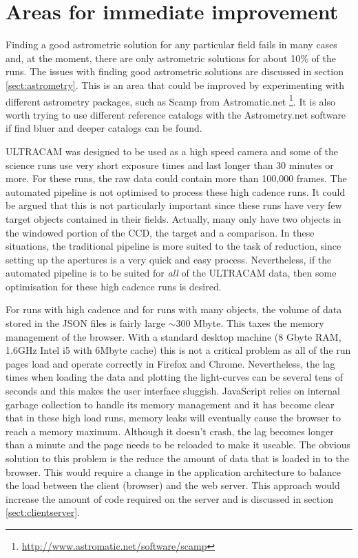 \section{Areas for immediate improvement}
Finding a good astrometric solution for any particular field fails in many cases and, at the moment, there are only astrometric solutions for about 10\% of the runs. The issues with finding good astrometric solutions are discussed in section \ref{sect:astrometry}. This is an area that could be improved by experimenting with different astrometry packages, such as Scamp from Astromatic.net \footnote{\url{http://www.astromatic.net/software/scamp}}. It is also worth trying to use different reference catalogs with the Astrometry.net software if find bluer and deeper catalogs can be found. 

ULTRACAM was designed to be used as a high speed camera and some of the science runs use very short exposure times and last longer than 30 minutes or more. For these runs,  the raw data could contain more than 100,000 frames. The automated pipeline is not optimised to process these high cadence runs. It could be argued that this is not particularly important since these runs have very few target objects contained in their fields. Actually, many only have two objects in the windowed portion of the CCD, the target and a comparison. In these situations, the traditional pipeline is more suited to the task of reduction, since setting up the apertures is a very quick and easy process. Nevertheless, if the automated pipeline is to be suited for \emph{all} of the ULTRACAM data, then some optimisation for these high cadence runs is desired. 

For runs with high cadence and for runs with many objects, the volume of data stored in the JSON files is fairly large $\sim 300$ Mbyte. This taxes the memory management of the browser. With a standard desktop machine (8 Gbyte RAM, 1.6GHz Intel i5 with 6Mbyte cache) this is not a critical problem as all of the run pages load and operate correctly in Firefox and Chrome. Nevertheless, the lag times when loading the data and plotting the light-curves can be several tens of seconds and this makes the user interface sluggish. JavaScript relies on internal garbage collection to handle its memory management and it has become clear that in these high load runs, memory leaks will eventually cause the browser to reach a memory maximum. Although it doesn't crash, the lag becomes longer than a minute and the page needs to be reloaded to make it useable. The obvious solution to this problem is the reduce the amount of data that is loaded in to the browser. This would require a change in the application architecture to balance the load between the client (browser) and the web server. This approach would increase the amount of code required on the server and is discussed in section \ref{sect:clientserver}.  

